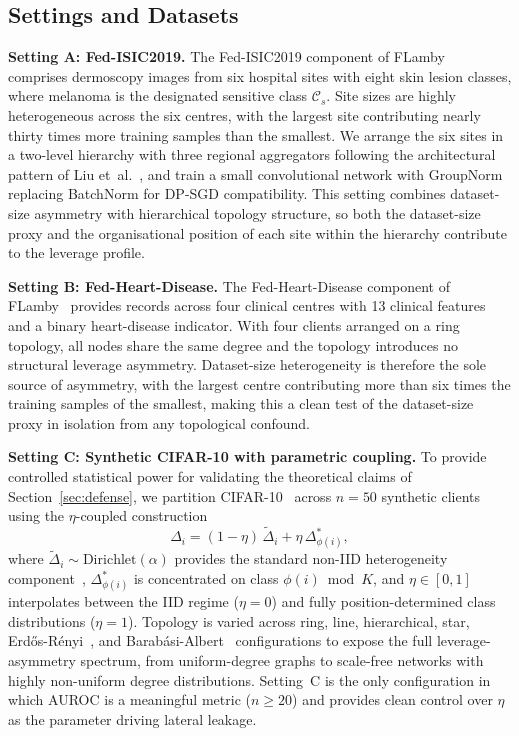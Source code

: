 \documentclass[letterpaper,journal]{IEEEtran}
\begin{document}
\subsection{Settings and Datasets}
\label{sec:experiments-settings}

\noindent\textbf{Setting A: Fed-ISIC2019.}
The Fed-ISIC2019 component of FLamby~\cite{flamby2022} comprises
dermoscopy images from six hospital sites with eight skin lesion
classes, where melanoma is the designated sensitive class
$\mathcal{C}_s$. Site sizes are highly heterogeneous across the six
centres, with the largest site contributing nearly thirty times more
training samples than the smallest. We arrange the six sites in a
two-level hierarchy with three regional aggregators following the
architectural pattern of Liu et~al.~\cite{liu2020hierarchical}, and
train a small convolutional network with GroupNorm replacing BatchNorm
for DP-SGD compatibility. This setting combines dataset-size asymmetry
with hierarchical topology structure, so both the dataset-size proxy
and the organisational position of each site within the hierarchy
contribute to the leverage profile.\medskip

\noindent\textbf{Setting B: Fed-Heart-Disease.}
The Fed-Heart-Disease component of FLamby~\cite{flamby2022} provides
records across four clinical centres with 13 clinical features and a
binary heart-disease indicator. With four clients arranged on a ring
topology, all nodes share the same degree and the topology introduces
no structural leverage asymmetry. Dataset-size heterogeneity is
therefore the sole source of asymmetry, with the largest centre
contributing more than six times the training samples of the smallest,
making this a clean test of the dataset-size proxy in isolation from
any topological confound.\medskip

\noindent\textbf{Setting C: Synthetic CIFAR-10 with parametric coupling.}
To provide controlled statistical power for validating the theoretical
claims of Section~\ref{sec:defense}, we partition
CIFAR-10~\cite{krizhevsky2009cifar} across $n = 50$ synthetic clients
using the $\eta$-coupled construction
\[
\Delta_i = (1-\eta)\,\tilde{\Delta}_i + \eta\,\Delta^*_{\phi(i)},
\]
where $\tilde{\Delta}_i \sim \mathrm{Dirichlet}(\alpha)$ provides
the standard non-IID heterogeneity
component~\cite{hsu2019dirichlet}, $\Delta^*_{\phi(i)}$ is
concentrated on class $\phi(i) \bmod K$, and $\eta \in [0,1]$
interpolates between the IID regime ($\eta = 0$) and fully
position-determined class distributions ($\eta = 1$). Topology is varied across ring, line, hierarchical, star,
Erd\H{o}s-R\'{e}nyi~\cite{erdos1959random}, and
Barab\'{a}si-Albert~\cite{barabasi1999emergence} configurations to
expose the full leverage-asymmetry spectrum, from uniform-degree
graphs to scale-free networks with highly non-uniform degree
distributions. Setting~C is
the only configuration in which AUROC is a meaningful metric
($n \geq 20$) and provides clean control over $\eta$ as the parameter
driving lateral leakage.
\end{document}
